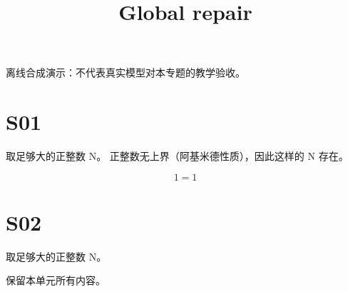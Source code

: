 \documentclass[UTF8,fontset=fandol,11pt]{ctexart}
\title{Global repair}
\date{}
\begin{document}
\maketitle
\par\noindent 离线合成演示：不代表真实模型对本专题的教学验收。\par
\section{S01}\label{sec:S01}
取足够大的正整数 N。 正整数无上界（阿基米德性质），因此这样的 N 存在。\par
\begin{equation}1=1\label{eq:old-unchecked}\end{equation}\par
\section{S02}\label{sec:S02}
取足够大的正整数 N。\par
保留本单元所有内容。\par
\end{document}
